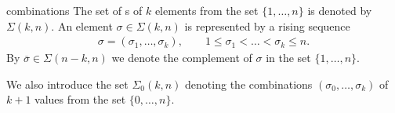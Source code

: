 \begin{Notation}{combinations}
  The set of s of $k$ elements from the set
  $\{1,\dots,n\}$ is denoted by $\Sigma(k,n)$. An element
  $\sigma\in\Sigma(k,n)$ is represented by a rising sequence
  \begin{gather}
    \sigma = (\sigma_1,\dots,\sigma_k),
    \qquad
    1\le \sigma_1 < \dots < \sigma_k \le n.
  \end{gather}
  By $\overline\sigma \in\Sigma(n-k,n)$ we denote the complement of
  $\sigma$ in the set $\{1,\dots,n\}$.
  
  We also introduce the set $\Sigma_0(k,n)$ denoting the combinations
  $(\sigma_0,\dots,\sigma_k)$ of $k+1$ values from the set
  $\{0,\dots,n\}$.
\end{Notation}
